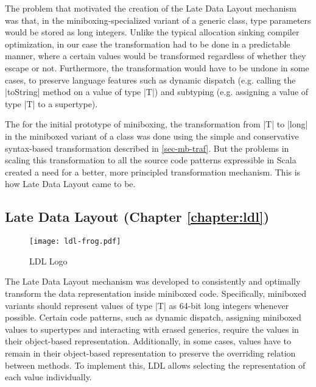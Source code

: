 The problem that motivated the creation of the Late Data Layout mechanism was that, in the miniboxing-specialized variant of a generic class, type parameters would be stored as long integers. Unlike the typical allocation sinking compiler optimization, in our case the transformation had to be done in a predictable manner, where a certain values would be transformed regardless of whether they escape or not. Furthermore, the transformation would have to be undone in some cases, to preserve language features such as dynamic dispatch (e.g. calling the |toString| method on a value of type |T|) and subtyping (e.g. assigning a value of type |T| to a supertype).

The for the initial prototype of miniboxing, the transformation from |T| to |long| in the miniboxed variant of a class was done using the simple and conservative syntax-based transformation described in \ref{sec-mb-traf}. But the problems in scaling this transformation to all the source code patterns expressible in Scala created a need for a better, more principled transformation mechanism. This is how Late Data Layout came to be.

\newpage

\subsection{Late Data Layout (Chapter \ref{chapter:ldl})}

\begin{wrapfigure}{r}{40mm}
  \centering
  \vspace{-2em}
  \texttt{[image: ldl-frog.pdf]}
  \vspace{-1em}
  \caption{LDL Logo}
  \vspace{-2em}
\end{wrapfigure}

The Late Data Layout mechanism was developed to consistently and optimally transform the data representation inside miniboxed code. Specifically, miniboxed variants should represent values of type |T| as 64-bit long integers whenever possible. Certain code patterns, such as dynamic dispatch, assigning miniboxed values to supertypes and interacting with erased generics, require the values in their object-based representation. Additionally, in some cases, values have to remain in their object-based representation to preserve the overriding relation between methods. To implement this, LDL allows selecting the representation of each value individually.

